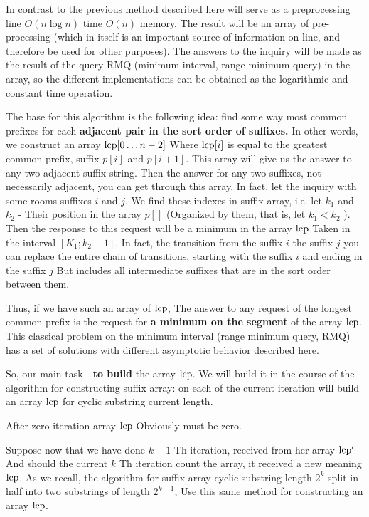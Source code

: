 In contrast to the previous method described here will serve as a preprocessing line $O (n \log n)$ time $O (n)$ memory. The result will be an array of pre-processing (which in itself is an important source of information on line, and therefore be used for other purposes). The answers to the inquiry will be made as the result of the query RMQ (minimum interval, range minimum query) in the array, so the different implementations can be obtained as the logarithmic and constant time operation.

The base for this algorithm is the following idea: find some way most common prefixes for each \textbf{adjacent pair in the sort order of suffixes.} In other words, we construct an array ${\rm lcp} [0 \ldots n-2]$ Where ${\rm lcp} [i]$ is equal to the greatest common prefix, suffix $p [i]$ and $p [i +1]$. This array will give us the answer to any two adjacent suffix string. Then the answer for any two suffixes, not necessarily adjacent, you can get through this array. In fact, let the inquiry with some rooms suffixes $i$ and $j$. We find these indexes in suffix array, i.e. let $k_1$ and $k_2$ - Their position in the array $p []$ (Organized by them, that is, let $k_1 <k_2$ ). Then the response to this request will be a minimum in the array $\rm lcp$ Taken in the interval $[K_1; k_2-1]$. In fact, the transition from the suffix $i$ the suffix $j$ you can replace the entire chain of transitions, starting with the suffix $i$ and ending in the suffix $j$ But includes all intermediate suffixes that are in the sort order between them.

Thus, if we have such an array of $\rm lcp$, The answer to any request of the longest common prefix is the request for \textbf{a minimum on the segment} of the array $\rm lcp$. This classical problem on the minimum interval (range minimum query, RMQ) has a set of solutions with different asymptotic behavior described here.

So, our main task - \textbf{to build} the array $\rm lcp$. We will build it in the course of the algorithm for constructing suffix array: on each of the current iteration will build an array $\rm lcp$ for cyclic substring current length.

After zero iteration array $\rm lcp$ Obviously must be zero.

Suppose now that we have done $k-1$ Th iteration, received from her array $\rm lcp ^ \prime$ And should the current $k$ Th iteration count the array, it received a new meaning $\rm lcp$. As we recall, the algorithm for suffix array cyclic substring length $2 ^ k$ split in half into two substrings of length $2 ^ {k-1}$, Use this same method for constructing an array $\rm lcp$.

